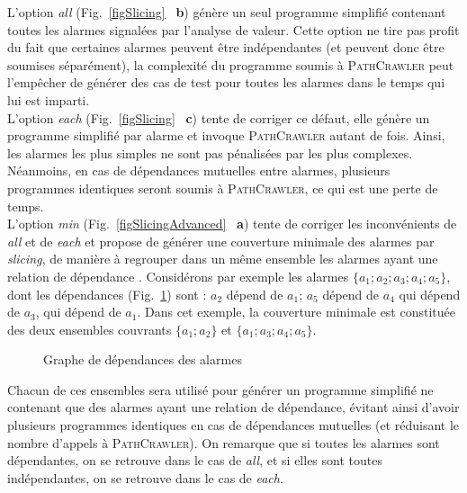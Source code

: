 L'option {\em all} (Fig.~\ref{figSlicing} ~\textbf{b}) génère un seul programme
simplifié contenant toutes les alarmes signalées par l'analyse de valeur. Cette
option ne tire pas profit du fait que certaines alarmes peuvent être
indépendantes (et peuvent donc être soumises séparément), la complexité du
programme soumis à \textsc{PathCrawler} peut l'empêcher de générer des cas de
test pour toutes les alarmes dans le temps qui lui est imparti.\\

L'option {\em each} (Fig.~\ref{figSlicing} ~\textbf{c}) tente de corriger ce
défaut, elle génère un programme simplifié par alarme et invoque
\textsc{PathCrawler} autant de fois. Ainsi, les alarmes les plus simples ne sont
pas pénalisées par les plus complexes. Néanmoins, en cas de dépendances
mutuelles entre alarmes, plusieurs programmes identiques seront soumis à
\textsc{PathCrawler}, ce qui est une perte de temps.\\




L'option {\em min} (Fig.~\ref{figSlicingAdvanced} ~\textbf{a}) tente de corriger
les inconvénients de {\em all} et de {\em each} et propose de générer une
couverture minimale des alarmes par {\em slicing}, de manière à regrouper dans
un même ensemble les alarmes ayant une relation de dépendance \cite{SANTE}.
Considérons par exemple les alarmes $\{a_1; a_2; a_3; a_4; a_5\}$, dont les
dépendances (Fig.~\ref{fig:deps}) sont : $a_2$ dépend de $a_1$; $a_5$ dépend de
$a_4$ qui dépend de $a_3$, qui dépend de $a_1$.
Dans cet exemple, la couverture minimale est constituée des deux ensembles
couvrants $\{a_1; a_2\}$ et $\{a_1; a_3; a_4; a_5\}$.\\


\begin{figure}
  \centering
  \caption{Graphe de dépendances des alarmes}
  \label{fig:deps}
\end{figure}


Chacun de ces ensembles sera utilisé pour générer un programme simplifié ne
contenant que des alarmes ayant une relation de dépendance, évitant ainsi
d'avoir plusieurs programmes identiques en cas de dépendances mutuelles (et
réduisant le nombre d'appels à \textsc{PathCrawler}).
On remarque que si toutes les alarmes sont dépendantes, on se retrouve dans le
cas de {\em all}, et si elles sont toutes indépendantes, on se retrouve dans le
cas de {\em each}.\\


